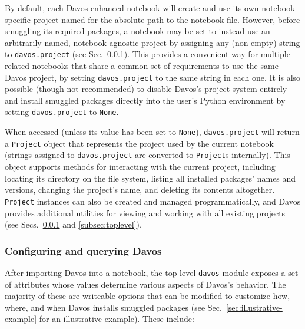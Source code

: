 \documentclass[preprint,12pt,a4paper]{elsarticle}
\begin{document}
By default, each Davos-enhanced notebook will create and use its own notebook-specific project named for the absolute path to the notebook file.
However, before smuggling its required packages, a notebook may be set to instead use an arbitrarily named, notebook-agnostic project by assigning any (non-empty) string to \texttt{davos.project} (see Sec.~\ref{subsec:config}).
This provides a convenient way for multiple related notebooks that share a common set of requirements to use the same Davos project, by setting \texttt{davos.project} to the same string in each one.
It is also possible (though not recommended) to disable Davos's project system entirely and install smuggled packages directly into the user's Python environment by setting \texttt{davos.project} to \texttt{None}.

When accessed (unless its value has been set to \texttt{None}), \texttt{davos.project} will return a \texttt{Project} object that represents the project used by the current notebook (strings assigned to \texttt{davos.project} are converted to \texttt{Project}s internally). This object supports methods for interacting with the current project, including locating its directory on the file system, listing all installed packages' names and versions, changing the project's name, and deleting its contents altogether.
\texttt{Project} instances can also be created and managed programmatically, and Davos provides additional utilities for viewing and working with all existing projects (see Secs.~\ref{subsec:config} and \ref{subsec:toplevel}).


\subsubsection{Configuring and querying Davos}\label{subsec:config}

After importing Davos into a notebook, the top-level \texttt{davos} module exposes a set of attributes whose values determine various aspects of Davos's behavior.
The majority of these are writeable options that can be modified to customize how, where, and when Davos installs smuggled packages (see Sec.~\ref{sec:illustrative-example} for an illustrative example).
These include:
\end{document}
